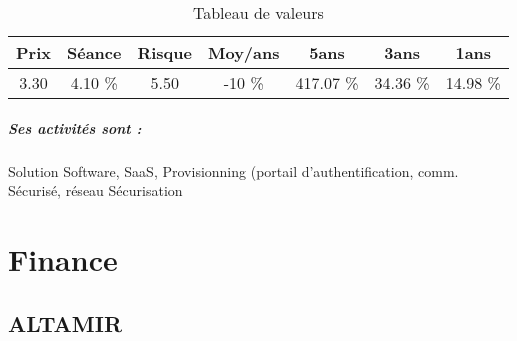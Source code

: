 \documentclass[11pt,a4paper]{report}%
\begin{document}
\begin{table}[H]
  \centering
    \begin{tabular}{|c|c|c|c|c|c|c|}
    \hline
    Prix & Séance & Risque  & Moy/ans & 5ans & 3ans & 1ans \\
    \hline
    3.30 &    4.10 \%    & 5.50 & -10 \% & 417.07 \% & 34.36 \% & 14.98 \% \\
    \hline
    \end{tabular}%
        \label{tab:table_VERIMATRIX}%
      \caption{Tableau de valeurs}
\end{table}%

\paragraph{Ses activités sont : } Solution Software, SaaS, Provisionning (portail d’authentification, comm. Sécurisé, réseau Sécurisation 
    
    \newpage\chapter{Finance}


\section{ALTAMIR}
\end{document}
